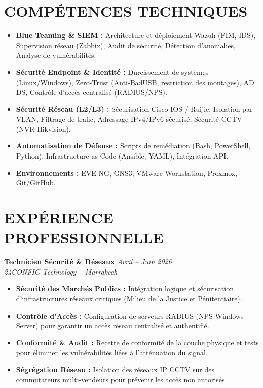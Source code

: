 \documentclass[10pt,a4paper]{article}
\begin{document}
\section*{COMPÉTENCES TECHNIQUES}
\begin{itemize}[leftmargin=*, itemsep=0.0pt, parsep=0pt, topsep=0pt]
    \item \textbf{Blue Teaming \& SIEM :} Architecture et déploiement Wazuh (FIM, IDS), Supervision réseau (Zabbix), Audit de sécurité, Détection d'anomalies, Analyse de vulnérabilités.
    \item \textbf{Sécurité Endpoint \& Identité :} Durcissement de systèmes (Linux/Windows), Zero-Trust (Anti-BadUSB, restriction des montages), AD DS, Contrôle d'accès centralisé (RADIUS/NPS).
    \item \textbf{Sécurité Réseau (L2/L3) :} Sécurisation Cisco IOS / Ruijie, Isolation par VLAN, Filtrage de trafic, Adressage IPv4/IPv6 sécurisé, Sécurité CCTV (NVR Hikvision).
    \item \textbf{Automatisation de Défense :} Scripts de remédiation (Bash, PowerShell, Python), Infrastructure as Code (Ansible, YAML), Intégration API.
    \item \textbf{Environnements :} EVE-NG, GNS3, VMware Workstation, Proxmox, Git/GitHub.
\end{itemize}

\section*{EXPÉRIENCE PROFESSIONNELLE}
\noindent
\textbf{Technicien Sécurité \& Réseaux} \hfill \textit{Avril -- Juin 2026}\\
\textit{24CONFIG Technology -- Marrakech}
\begin{itemize}[leftmargin=*, itemsep=0.0pt, parsep=0pt, topsep=0pt]
    \item \textbf{Sécurité des Marchés Publics :} Intégration logique et sécurisation d'infrastructures réseaux critiques (Milieu de la Justice et Pénitentiaire).
    \item \textbf{Contrôle d'Accès :} Configuration de serveurs RADIUS (NPS Windows Server) pour garantir un accès réseau centralisé et authentifié.
    \item \textbf{Conformité \& Audit :} Recette de conformité de la couche physique et tests pour éliminer les vulnérabilités liées à l'atténuation du signal.
    \item \textbf{Ségrégation Réseau :} Isolation des réseaux IP CCTV sur des commutateurs multi-vendeurs pour prévenir les accès non autorisés.
\end{itemize}
\end{document}
